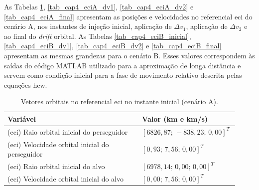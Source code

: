 \label{ap_ApendiceA}

As Tabelas \ref{tab_cap4_eciA_inicial}, \ref{tab_cap4_eciA_dv1}, \ref{tab_cap4_eciA_dv2} e \ref{tab_cap4_eciA_final}
apresentam as posições e velocidades no referencial \gls{eci} do cenário A, nos instantes de injeção inicial, aplicação de $\Delta v_1$,
aplicação de $\Delta v_2$ e ao final do \emph{drift} orbital.
As Tabelas \ref{tab_cap4_eciB_inicial}, \ref{tab_cap4_eciB_dv1}, \ref{tab_cap4_eciB_dv2} e \ref{tab_cap4_eciB_final}
apresentam as mesmas grandezas para o cenário B.
Esses valores correspondem às saídas do código MATLAB utilizado para a aproximação de longa distância e servem como condição inicial para a fase de movimento relativo descrita pelas equações \gls{hcw}.


\begin{table}[H]
\centering
\caption{Vetores orbitais no referencial \gls{eci} no instante inicial (cenário A).}
\label{tab_cap4_eciA_inicial}
\begingroup
\small
\setlength{\tabcolsep}{4pt}
\renewcommand{\arraystretch}{1.15}
\begin{tabular}{|p{0.58\linewidth}|p{0.34\linewidth}|}
\hline
Variável & Valor (km e km/s)\\
\hline
(\gls{eci}) Raio orbital inicial do perseguidor &
$\left[6826,87;\,-838,23;\,0,00\right]^T$\\
\hline
(\gls{eci}) Velocidade orbital inicial do perseguidor &
$\left[0,93;\,7,56;\,0,00\right]^T$\\
\hline
(\gls{eci}) Raio orbital inicial do alvo &
$\left[6978,14;\,0,00;\,0,00\right]^T$\\
\hline
(\gls{eci}) Velocidade orbital inicial do alvo &
$\left[0,00;\,7,56;\,0,00\right]^T$\\
\hline
\end{tabular}
\endgroup
\end{table}

